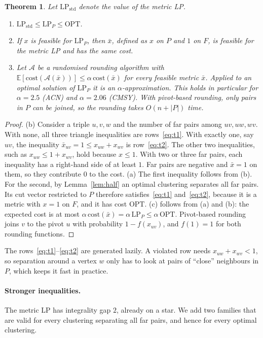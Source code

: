 \documentclass[11pt]{article}
\newtheorem{theorem}{Theorem}
\theoremstyle{definition}
\newcommand{\OPT}{\mathrm{OPT}}
\newcommand{\cost}{\mathrm{cost}}
\begin{document}
\begin{theorem}\label{thm:sparse}
Let $\mathrm{LP}_{\mathrm{std}}$ denote the value of the metric LP.
\begin{enumerate}
\item[(a)] $\mathrm{LP}_{\mathrm{std}}\le \mathrm{LP}_P\le\OPT$.
\item[(b)] If $x$ is feasible for $\mathrm{LP}_P$, then $\bar x$, defined as $x$ on
$P$ and $1$ on $F$, is feasible for the metric LP and has the same cost.
\item[(c)] Let $\mathcal A$ be a randomised rounding algorithm with
$\mathbb E[\cost(\mathcal A(\bar x))]\le\alpha\,\mathrm{cost}(\bar x)$ for every
feasible metric $\bar x$.  Applied to an optimal solution of $\mathrm{LP}_P$ it
is an $\alpha$-approximation.  This holds in particular for $\alpha=2.5$
(ACN) and $\alpha=2.06$ (CMSY).  With pivot-based rounding, only pairs in
$P$ can be joined, so the rounding takes $O(n+|P|)$ time.
\end{enumerate}
\end{theorem}
\begin{proof}
(b) Consider a triple $u,v,w$ and the number of far pairs among $uv,uw,wv$.
With none, all three triangle inequalities are rows~\eqref{eq:t1}.  With
exactly one, say $uv$, the inequality $\bar x_{uv}=1\le x_{uw}+x_{wv}$ is
row~\eqref{eq:t2}.  The other two inequalities, such as
$x_{uw}\le 1+x_{wv}$, hold because $x\le 1$.  With two or three far pairs, each
inequality has a right-hand side of at least $1$.  Far pairs are negative and
$\bar x=1$ on them, so they contribute $0$ to the cost.  (a) The first
inequality follows from (b).  For the second, by Lemma~\ref{lem:half} an
optimal clustering separates all far pairs.  Its cut vector restricted to $P$
therefore satisfies~\eqref{eq:t1} and~\eqref{eq:t2}, because it is a metric
with $x=1$ on $F$, and it has cost $\OPT$.  (c) follows from (a) and (b): the
expected cost is at most $\alpha\,\mathrm{cost}(\bar x)=\alpha\,\mathrm{LP}_P
\le\alpha\,\OPT$.  Pivot-based rounding joins $v$ to the pivot $u$ with
probability $1-f(x_{uv})$, and $f(1)=1$ for both rounding functions.
\end{proof}

The rows~\eqref{eq:t1}--\eqref{eq:t2} are generated lazily.  A violated row
needs $x_{uw}+x_{wv}<1$, so separation around a vertex $w$ only has to look at
pairs of ``close'' neighbours in $P$, which keeps it fast in practice.

\paragraph{Stronger inequalities.}  The metric LP has integrality gap $2$,
already on a star.  We add two families that are valid for every clustering
separating all far pairs, and hence for every optimal clustering.
\end{document}
